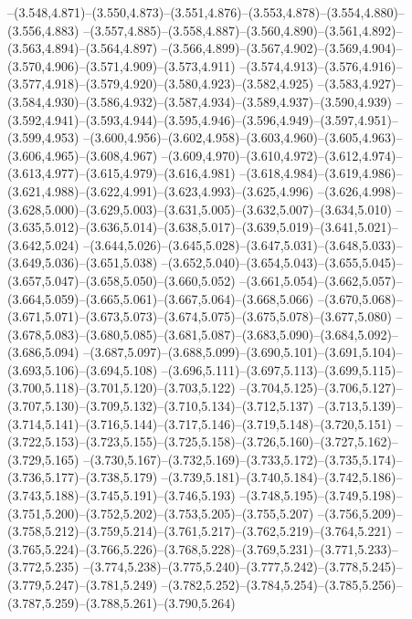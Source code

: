   --(3.548,4.871)--(3.550,4.873)--(3.551,4.876)--(3.553,4.878)--(3.554,4.880)--(3.556,4.883)%
  --(3.557,4.885)--(3.558,4.887)--(3.560,4.890)--(3.561,4.892)--(3.563,4.894)--(3.564,4.897)%
  --(3.566,4.899)--(3.567,4.902)--(3.569,4.904)--(3.570,4.906)--(3.571,4.909)--(3.573,4.911)%
  --(3.574,4.913)--(3.576,4.916)--(3.577,4.918)--(3.579,4.920)--(3.580,4.923)--(3.582,4.925)%
  --(3.583,4.927)--(3.584,4.930)--(3.586,4.932)--(3.587,4.934)--(3.589,4.937)--(3.590,4.939)%
  --(3.592,4.941)--(3.593,4.944)--(3.595,4.946)--(3.596,4.949)--(3.597,4.951)--(3.599,4.953)%
  --(3.600,4.956)--(3.602,4.958)--(3.603,4.960)--(3.605,4.963)--(3.606,4.965)--(3.608,4.967)%
  --(3.609,4.970)--(3.610,4.972)--(3.612,4.974)--(3.613,4.977)--(3.615,4.979)--(3.616,4.981)%
  --(3.618,4.984)--(3.619,4.986)--(3.621,4.988)--(3.622,4.991)--(3.623,4.993)--(3.625,4.996)%
  --(3.626,4.998)--(3.628,5.000)--(3.629,5.003)--(3.631,5.005)--(3.632,5.007)--(3.634,5.010)%
  --(3.635,5.012)--(3.636,5.014)--(3.638,5.017)--(3.639,5.019)--(3.641,5.021)--(3.642,5.024)%
  --(3.644,5.026)--(3.645,5.028)--(3.647,5.031)--(3.648,5.033)--(3.649,5.036)--(3.651,5.038)%
  --(3.652,5.040)--(3.654,5.043)--(3.655,5.045)--(3.657,5.047)--(3.658,5.050)--(3.660,5.052)%
  --(3.661,5.054)--(3.662,5.057)--(3.664,5.059)--(3.665,5.061)--(3.667,5.064)--(3.668,5.066)%
  --(3.670,5.068)--(3.671,5.071)--(3.673,5.073)--(3.674,5.075)--(3.675,5.078)--(3.677,5.080)%
  --(3.678,5.083)--(3.680,5.085)--(3.681,5.087)--(3.683,5.090)--(3.684,5.092)--(3.686,5.094)%
  --(3.687,5.097)--(3.688,5.099)--(3.690,5.101)--(3.691,5.104)--(3.693,5.106)--(3.694,5.108)%
  --(3.696,5.111)--(3.697,5.113)--(3.699,5.115)--(3.700,5.118)--(3.701,5.120)--(3.703,5.122)%
  --(3.704,5.125)--(3.706,5.127)--(3.707,5.130)--(3.709,5.132)--(3.710,5.134)--(3.712,5.137)%
  --(3.713,5.139)--(3.714,5.141)--(3.716,5.144)--(3.717,5.146)--(3.719,5.148)--(3.720,5.151)%
  --(3.722,5.153)--(3.723,5.155)--(3.725,5.158)--(3.726,5.160)--(3.727,5.162)--(3.729,5.165)%
  --(3.730,5.167)--(3.732,5.169)--(3.733,5.172)--(3.735,5.174)--(3.736,5.177)--(3.738,5.179)%
  --(3.739,5.181)--(3.740,5.184)--(3.742,5.186)--(3.743,5.188)--(3.745,5.191)--(3.746,5.193)%
  --(3.748,5.195)--(3.749,5.198)--(3.751,5.200)--(3.752,5.202)--(3.753,5.205)--(3.755,5.207)%
  --(3.756,5.209)--(3.758,5.212)--(3.759,5.214)--(3.761,5.217)--(3.762,5.219)--(3.764,5.221)%
  --(3.765,5.224)--(3.766,5.226)--(3.768,5.228)--(3.769,5.231)--(3.771,5.233)--(3.772,5.235)%
  --(3.774,5.238)--(3.775,5.240)--(3.777,5.242)--(3.778,5.245)--(3.779,5.247)--(3.781,5.249)%
  --(3.782,5.252)--(3.784,5.254)--(3.785,5.256)--(3.787,5.259)--(3.788,5.261)--(3.790,5.264)%
